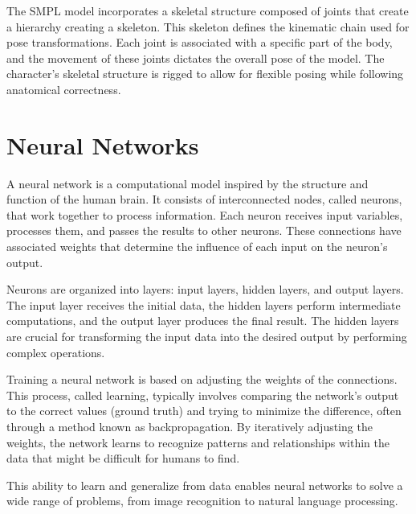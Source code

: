 The SMPL model incorporates a skeletal structure composed of joints that create a hierarchy creating a skeleton. This skeleton defines the kinematic chain used for pose transformations. Each joint is associated with a specific part of the body, and the movement of these joints dictates the overall pose of the model. The character's skeletal structure is rigged to allow for flexible posing while following anatomical correctness.


\section{Neural Networks}
A neural network is a computational model inspired by the structure and function of the human brain. It consists of interconnected nodes, called neurons, that work together to process information. Each neuron receives input variables, processes them, and passes the results to other neurons. These connections have associated weights that determine the influence of each input on the neuron's output.

Neurons are organized into layers: input layers, hidden layers, and output layers. The input layer receives the initial data, the hidden layers perform intermediate computations, and the output layer produces the final result. The hidden layers are crucial for transforming the input data into the desired output by performing complex operations.

Training a neural network is based on adjusting the weights of the connections. This process, called learning, typically involves comparing the network's output to the correct values (ground truth) and trying to minimize the difference, often through a method known as backpropagation. By iteratively adjusting the weights, the network learns to recognize patterns and relationships within the data that might be difficult for humans to find.

This ability to learn and generalize from data enables neural networks to solve a wide range of problems, from image recognition to natural language processing.

